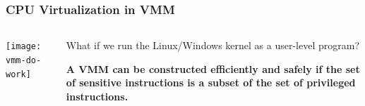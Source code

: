 \begin{frame}
	\frametitle{CPU Virtualization in VMM}
	
	\begin{columns}
		
		\begin{column}{.35\textwidth}
			
			\texttt{[image: vmm-do-work]}	
			
		\end{column}
		
		\begin{column}{.65\textwidth}
			What if we run the Linux/Windows kernel as a user-level program?	
			
			\begin{flushleft}
				\textbf{A VMM can be constructed efficiently and safely if the set of sensitive instructions is a subset of the set of privileged instructions.}
			\end{flushleft}
%				
		\end{column}
	\end{columns}
\end{frame}
